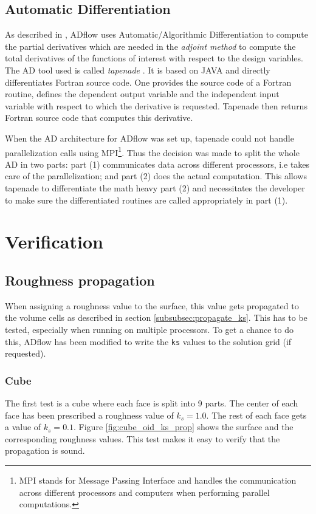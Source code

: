 \subsection{Automatic Differentiation}
As described in \cite{cm1}, ADflow uses Automatic/Algorithmic Differentiation to
compute the partial derivatives which are needed in the \textit{adjoint method}
to compute the total derivatives of the functions of interest with respect to
the design variables. The AD tool used is called \textit{tapenade}
\cite{tapenade}. It is based on JAVA and directly differentiates Fortran source
code. One provides the source code of a Fortran routine, defines the dependent
output variable and the independent input variable with respect to which the
derivative is requested. Tapenade then returns Fortran source code that
computes this derivative.

When the AD architecture for ADflow was set up, tapenade could not handle
parallelization calls using MPI\footnote{MPI stands for Message Passing
Interface and handles the communication across different processors and
computers when performing parallel computations.}. Thus the decision was made to
split the whole AD in two parts: part (1) communicates data across different
processors, i.e takes care of the parallelization; and part (2) does the actual
computation. This allows tapenade to differentiate the math heavy part (2) and
necessitates the developer to make sure the differentiated routines are called
appropriately in part (1).


\section{Verification}

\subsection{Roughness propagation}
\label{subsec:roughness_prop}
When assigning a roughness value to the surface, this value gets propagated to
the volume cells as described in section \ref{subsubsec:propagate_ks}. This has
to be tested, especially when running on multiple processors. To get a chance to
do this, ADflow has been modified to write the \texttt{ks} values to the
solution grid (if requested).

\subsubsection{Cube}
The first test is a cube where each face is split into 9 parts. The center of
each face has been prescribed a roughness value of $k_{s} = 1.0$. The rest of
each face gets a value of $k_{s} = 0.1$. Figure \ref{fig:cube_oid_ks_prop} shows
the surface and the corresponding roughness values. This test makes it easy to
verify that the propagation is sound.

